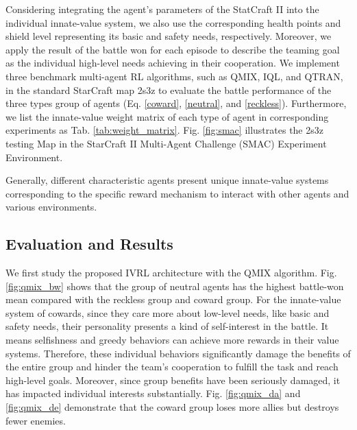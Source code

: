 \documentclass[letterpaper]{article} %
\begin{document}
Considering integrating the agent's parameters of the StatCraft II into the individual innate-value system, we also use the corresponding health points and shield level representing its basic and safety needs, respectively. Moreover, we apply the result of the battle won for each episode to describe the teaming goal as the individual high-level needs achieving in their cooperation. We implement three benchmark multi-agent RL algorithms, such as QMIX, IQL, and QTRAN, in the standard StarCraft map 2s3z to evaluate the battle performance of the three types group of agents (Eq. \eqref{coward}, \eqref{neutral}, and \eqref{reckless}). Furthermore, we list the innate-value weight matrix of each type of agent in corresponding experiments as Tab. \ref{tab:weight_matrix}. Fig. \ref{fig:smac} illustrates the 2s3z testing Map in the StarCraft II Multi-Agent Challenge (SMAC) Experiment Environment.

\begin{table}[h]
 \renewcommand\arraystretch{1.5}
 \caption{\small{Innate-Value Weight Matrix of Each Type of Agent in Experiments.}}
    \label{tab:weight_matrix}
\end{table}

Generally, different characteristic agents present unique innate-value systems corresponding to the specific reward mechanism to interact with other agents and various environments.

\subsection{Evaluation and Results}

We first study the proposed IVRL architecture with the QMIX algorithm. Fig. \ref{fig:qmix_bw} shows that the group of neutral agents has the highest battle-won mean compared with the reckless group and coward group. For the innate-value system of cowards, since they care more about low-level needs, like basic and safety needs, their personality presents a kind of self-interest in the battle. It means selfishness and greedy behaviors can achieve more rewards in their value systems. Therefore, these individual behaviors significantly damage the benefits of the entire group and hinder the team's cooperation to fulfill the task and reach high-level goals. Moreover, since group benefits have been seriously damaged, it has impacted individual interests substantially. Fig. \ref{fig:qmix_da} and \ref{fig:qmix_de} demonstrate that the coward group loses more allies but destroys fewer enemies.
 
\end{document}

